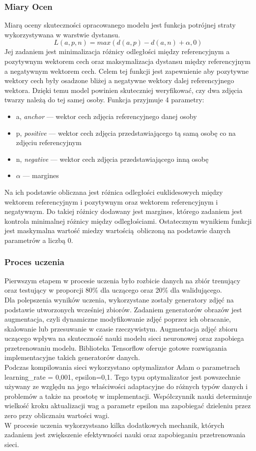 \subsubsection{Miary Ocen}
Miarą oceny skuteczności opracowanego modelu jest funkcja potrójnej straty wykorzystywana w warstwie dystansu.
$$ L(a, p, n) = max(d(a, p) - d(a, n) + \alpha, 0) $$
  Jej zadaniem jest minimalizacja różnicy odległości między referencyjnym a pozytywnym wektorem cech oraz maksymalizacja dystansu między referencyjnym a negatywnym wektorem cech. Celem tej funkcji jest zapewnienie aby pozytywne wektory cech były osadzone bliżej a negatywne wektory dalej referencyjnego wektora. Dzięki temu model powinien skuteczniej weryfikować, czy dwa zdjęcia twarzy należą do tej samej osoby.
Funkcja przyjmuje 4 parametry:
\begin{itemize}
  \item a, \emph{anchor} --- wektor cech zdjęcia referencyjnego danej osoby
  \item p, \emph{positive} --- wektor cech zdjęcia przedstawiającego tą samą osobę co na zdjęciu referencyjnym
  \item n, \emph{negative} --- wektor cech zdjęcia przedstawiającego inną osobę
  \item $\alpha$ --- margines
\end{itemize}
Na ich podstawie obliczana jest różnica odległości euklidesowych między wektorem referencyjnym i pozytywnym oraz wektorem referencyjnym i negatywnym. Do takiej różnicy dodawany jest margines, którego zadaniem jest kontrola minimalnej różnicy między odległościami. Ostatecznym wynikiem funkcji jest maskymalna wartość miedzy wartością obliczoną na podstawie danych parametrów a liczbą 0. 
\subsubsection{Proces uczenia}
Pierwszym etapem w procesie uczenia było rozbicie danych na zbiór trenujący oraz testujący w proporcji 80\% dla uczącego oraz 20\% dla walidującego. \\
Dla polepszenia wyników uczenia, wykorzystane zostały generatory zdjęć na podstawie utworzonych wcześniej zbiorów. Zadaniem generatorów obrazów jest augmentacja, czyli dynamiczne modyfikowanie zdjęć poprzez ich obracanie, skalowanie lub przesuwanie w czasie rzeczywistym. Augmentacja zdjęć zbioru uczącego wpływa na skuteczność nauki modelu sieci neuronowej oraz zapobiega przetrenowaniu modelu. Biblioteka Tensorflow oferuje gotowe rozwiązania implementacyjne takich generatorów danych. \\
Podczas kompilowania sieci wykorzystano optymalizator Adam o parametrach learning\_rate = 0,001, epsilon=0,1. Tego typu optymalizator jest powszechnie używany ze względu na jego właściwości adaptacyjne do różnych typów danych i problemów a także na prostotę w implementacji. Współczynnik nauki determinuje wielkość kroku aktualizacji wag a parametr epsilon ma zapobiegać dzieleniu przez zero przy oblicznaiu wartości wagi. \\
W procesie uczenia wykorzystsano kilka dodatkowych mechanik, których zadaniem jest zwiększenie efektywności nauki oraz zapobieganiu przetrenowania sieci.
